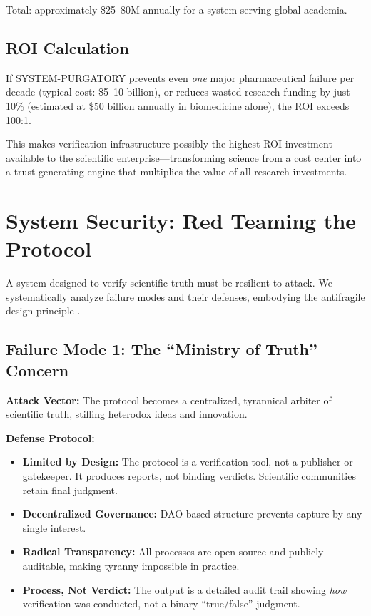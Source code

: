 \documentclass[11pt,a4paper]{article}
\begin{document}
\begin{small}
\noindent Total: approximately \$25--80M annually for a system serving global academia.

\subsection{ROI Calculation}
If SYSTEM-PURGATORY prevents even \textit{one} major pharmaceutical failure per decade (typical cost: \$5--10 billion), or reduces wasted research funding by just 10\% (estimated at \$50 billion annually in biomedicine alone), the ROI exceeds 100:1.

This makes verification infrastructure possibly the highest-ROI investment available to the scientific enterprise—transforming science from a cost center into a trust-generating engine that multiplies the value of all research investments.

\section{System Security: Red Teaming the Protocol}
A system designed to verify scientific truth must be resilient to attack. We systematically analyze failure modes and their defenses, embodying the antifragile design principle \citep{Taleb2012}.

\subsection{Failure Mode 1: The ``Ministry of Truth'' Concern}
\textbf{Attack Vector:} The protocol becomes a centralized, tyrannical arbiter of scientific truth, stifling heterodox ideas and innovation.

\textbf{Defense Protocol:}
\begin{itemize}[nosep]
    \item \textbf{Limited by Design:} The protocol is a verification tool, not a publisher or gatekeeper. It produces reports, not binding verdicts. Scientific communities retain final judgment.
    \item \textbf{Decentralized Governance:} DAO-based structure prevents capture by any single interest.
    \item \textbf{Radical Transparency:} All processes are open-source and publicly auditable, making tyranny impossible in practice.
    \item \textbf{Process, Not Verdict:} The output is a detailed audit trail showing \textit{how} verification was conducted, not a binary ``true/false'' judgment.
\end{itemize}


\end{small}
\end{document}
